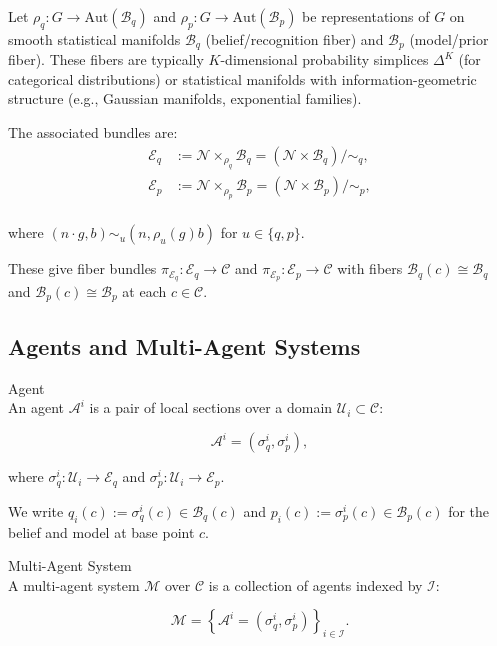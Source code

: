 \documentclass[twoside,11pt]{article}
\begin{document}
Let $\rho_q: G \to \text{Aut}(\mathcal{B}_q)$ and $\rho_p: G \to \text{Aut}(\mathcal{B}_p)$ be representations of $G$ on smooth statistical manifolds $\mathcal{B}_q$ (belief/recognition fiber) and $\mathcal{B}_p$ (model/prior fiber). These fibers are typically $K$-dimensional probability simplices $\Delta^K$ (for categorical distributions) or statistical manifolds with information-geometric structure (e.g., Gaussian manifolds, exponential families).

The associated bundles are:\\
\begin{align}
\mathcal{E}_q &:= \mathcal{N} \times_{\rho_q} \mathcal{B}_q = \left(\mathcal{N} \times \mathcal{B}_q\right)/\sim_q, \\
\mathcal{E}_p &:= \mathcal{N} \times_{\rho_p} \mathcal{B}_p = \left(\mathcal{N} \times \mathcal{B}_p\right)/\sim_p,
\end{align}\\
where $(n \cdot g, b) \sim_u (n, \rho_u(g)b)$ for $u \in \{q,p\}$.

These give fiber bundles $\pi_{\mathcal{E}_q}: \mathcal{E}_q \to \mathcal{C}$ and $\pi_{\mathcal{E}_p}: \mathcal{E}_p \to \mathcal{C}$ with fibers $\mathcal{B}_q(c) \cong \mathcal{B}_q$ and $\mathcal{B}_p(c) \cong \mathcal{B}_p$ at each $c \in \mathcal{C}$.

\subsection{Agents and Multi-Agent Systems}
Agent\\
An agent $\mathcal{A}^i$ is a pair of local sections over a domain $\mathcal{U}_i \subset \mathcal{C}$:

\begin{equation}
\mathcal{A}^i = \left(\sigma^i_q, \sigma^i_p\right),
\end{equation}

where $\sigma^i_q : \mathcal{U}_i \to \mathcal{E}_q$ and $\sigma^i_p : \mathcal{U}_i \to \mathcal{E}_p$.

We write $q_i(c) := \sigma^i_q(c) \in \mathcal{B}_q(c)$ and $p_i(c) := \sigma^i_p(c) \in \mathcal{B}_p(c)$ for the belief and model at base point $c$.

Multi-Agent System\\
A multi-agent system $\mathcal{M}$ over $\mathcal{C}$ is a collection of agents indexed by $\mathcal{I}$:

\begin{equation}
\mathcal{M} = \left\{\mathcal{A}^i = \left(\sigma^i_q, \sigma^i_p\right)\right\}_{i \in \mathcal{I}}.
\end{equation}
\end{document}
